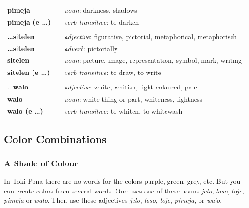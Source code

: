 \begin{supertabular}{p{2,5cm}|ll}
    \textbf{pimeja}            &  & \textit{noun}: darkness, shadows                                      \\
    \textbf{pimeja (e \dots)}  &  & \textit{verb transitive}: to darken                                   \\
                               &  &                                                                       \\
    \textbf{\dots sitelen}     &  & \textit{adjective}: figurative, pictorial, metaphorical, metaphorisch \\
    \textbf{\dots sitelen}     &  & \textit{adverb}: pictorially                                          \\
    \textbf{sitelen}           &  & \textit{noun}: picture, image, representation, symbol, mark, writing  \\
    \textbf{sitelen (e \dots)} &  & \textit{verb transitive}: to draw, to write                           \\
                               &  &                                                                       \\
    \textbf{\dots walo}        &  & \textit{adjective}: white, whitish, light-coloured, pale              \\
    \textbf{walo}              &  & \textit{noun}: white thing or part, whiteness, lightness              \\
    \textbf{walo (e \dots)}    &  & \textit{verb transitive}: to whiten, to whitewash                     \\
\end{supertabular}

\newpage

\subsection*{Color Combinations}
\subsubsection*{A Shade of Colour}
In Toki Pona there are no words for the colors purple, green, grey, etc.
But you can create colors from several words.
One uses one of these nouns \textit{jelo}, \textit{laso}, \textit{loje}, \textit{pimeja} or \textit{walo}.
Then use these adjectives \textit{jelo}, \textit{laso}, \textit{loje}, \textit{pimeja}, or \textit{walo}.

